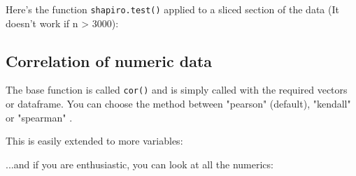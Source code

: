\documentclass[titlepage]{book}\usepackage{knitr}
\begin{document}
Here's the function \texttt{shapiro.test()} applied to a sliced section of the data (It doesn't work if n > 3000):

\begin{knitrout}
\color{fgcolor}\begin{kframe}
\begin{alltt}
\hlopt{$}\hlstd{bmi[}\hlopt{:}\hlstd{])}
\end{alltt}
\end{kframe}
\end{knitrout}

\subsection{Correlation of numeric data} 

The base function is called \texttt{cor()} and is simply called with the required vectors or dataframe. You can choose the method between "pearson" (default), "kendall" or "spearman" .

\begin{knitrout}
\color{fgcolor}
\end{knitrout}

This is easily extended to more variables:

\begin{knitrout}
\color{fgcolor}
\end{knitrout}

...and if you are enthusiastic, you can look at all the numerics:
\end{document}
